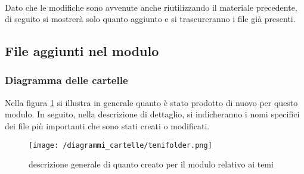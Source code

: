 \paragraph{} Dato che le modifiche sono avvenute anche riutilizzando il materiale precedente, di seguito si mostrerà solo quanto aggiunto e si trascureranno i file già presenti.
\subsection{File aggiunti nel modulo}
\subsubsection{Diagramma delle cartelle}
Nella figura \ref{fig:cartelle-tema} si illustra in generale quanto è stato prodotto di nuovo per questo modulo. In seguito, nella descrizione di dettaglio, si indicheranno i nomi specifici dei file più importanti che sono stati creati o modificati.
\begin{figure}
\centering
\texttt{[image: /diagrammi\_cartelle/temifolder.png]}
\caption{descrizione generale di quanto creato per il modulo relativo ai temi\label{fig:cartelle-tema}}
\end{figure}
\FloatBarrier
